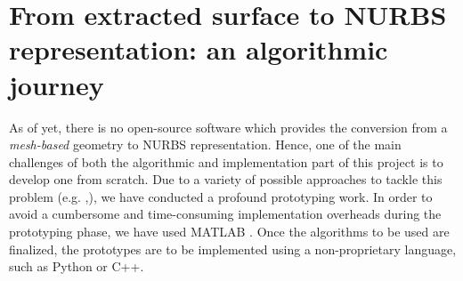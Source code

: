 \section{From extracted surface to NURBS representation: an algorithmic journey}
As of yet, there is no open-source software which provides the conversion from a \textit{mesh-based} geometry to NURBS representation. Hence, one of the main challenges of both the algorithmic and implementation part of this project is to develop one from scratch. Due to a variety of possible approaches to tackle this problem (e.g. \cite{becker2011advanced},\cite{eck1996automatic}), we have conducted a profound prototyping work. In order to avoid a cumbersome and time-consuming implementation overheads during the prototyping phase, we have used MATLAB \cite{MATLAB}. Once the algorithms to be used are finalized, the prototypes are to be implemented using a non-proprietary language, such as Python or C++.


